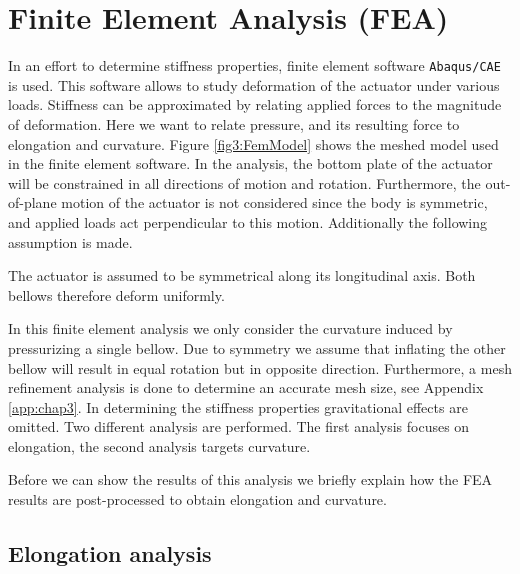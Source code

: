 
\section{Finite Element Analysis (FEA)}

In an effort to determine stiffness properties, finite element software \verb+Abaqus/CAE+ is used. This software allows to study deformation of the actuator under various loads. Stiffness can be approximated by relating applied forces to the magnitude of deformation. Here we want to relate pressure, and its resulting force to elongation and curvature. Figure  \ref{fig3:FemModel} shows the meshed model used in the finite element software. In the analysis, the bottom plate of the actuator will be constrained in all directions of motion and rotation. Furthermore, the out-of-plane motion of the actuator is not considered since the body is symmetric, and applied loads act perpendicular to this motion. Additionally the following assumption is made. 

\begin{theorem}
The actuator is assumed to be symmetrical along its longitudinal axis. Both bellows therefore deform uniformly.
\end{theorem}


In this finite element analysis we only consider the curvature induced by pressurizing a single bellow. Due to symmetry we assume that inflating the other bellow will result in equal rotation but in opposite direction. Furthermore, a mesh refinement analysis is done to determine an accurate mesh size, see Appendix \ref{app:chap3}. In determining the stiffness properties gravitational effects are omitted. Two different analysis are performed. The first analysis focuses on elongation, the second analysis targets curvature. 

Before we can show the results of this analysis we briefly explain how the FEA results are post-processed to obtain elongation and curvature.


\subsection{Elongation analysis}


